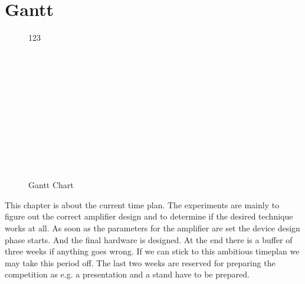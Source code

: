 \documentclass{report}
\begin{document}
\chapter{Gantt}
\begin{figure}[h]
	\centering
	\begin{ganttchart}
		[
		hgrid, 
		vgrid,
		x unit = 0.5cm,
		y unit chart = 0.6cm
		]{1}{23}
		 \\
		\\ 
		\\	
		\\
		\\	
		\\
		\\
		\\
		\\
		\\
		\\
		\\
		\end{ganttchart}
	\caption[]{Gantt Chart}  
	\label{fig:zeitplan}  
\end{figure}
This chapter is about the current time plan. The experiments are mainly to figure out the correct amplifier design and to determine if the desired technique works at all. As soon as the parameters for the amplifier are set the device design phase starts. And the final hardware is designed. At the end there is a buffer of three weeks if anything goes wrong. If we can stick to this ambitious timeplan we may take this period off. The last two weeks are reserved for preparing the competition as e.g. a presentation and a stand have to be prepared.  

\printbibliography[heading=bibintoc]

\clearpage
{}
\setcounter{page}{\value{roman}}
\pagestyle{empty}
\appendix
\end{document}
